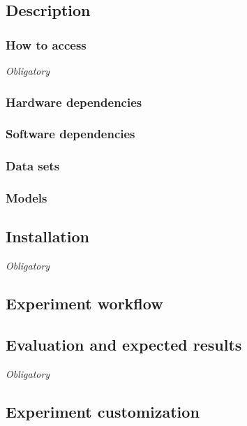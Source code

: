{\subsection{Description}

\subsubsection{How to access}

{\em Obligatory}

\subsubsection{Hardware dependencies}

\subsubsection{Software dependencies}

\subsubsection{Data sets}

\subsubsection{Models}

\subsection{Installation}

{\em Obligatory}

\subsection{Experiment workflow}

\subsection{Evaluation and expected results}

{\em Obligatory}

\subsection{Experiment customization}

}
